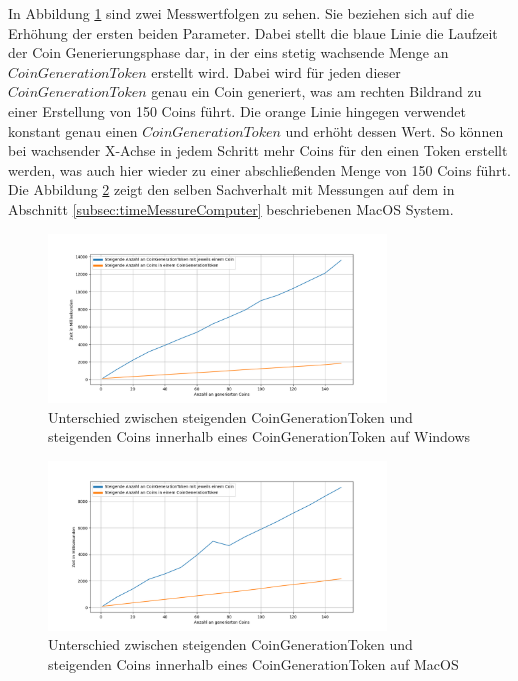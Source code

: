 \documentclass{scrreprt}
\begin{document}
In Abbildung \ref{fig:win_coins} sind zwei Messwertfolgen zu sehen. Sie beziehen sich auf die Erhöhung der ersten beiden Parameter. Dabei stellt die blaue Linie die Laufzeit der Coin Generierungsphase dar, in der eins stetig wachsende Menge an $CoinGenerationToken$ erstellt wird. Dabei wird für jeden dieser $CoinGenerationToken$ genau ein Coin generiert, was am rechten Bildrand zu einer Erstellung von 150 Coins führt. Die orange Linie hingegen verwendet konstant genau einen $CoinGenerationToken$ und erhöht dessen Wert. So können bei wachsender X-Achse in jedem Schritt mehr Coins für den einen Token erstellt werden, was auch hier wieder zu einer abschließenden Menge von 150 Coins führt. Die Abbildung \ref{fig:mac_coins} zeigt den selben Sachverhalt mit Messungen auf dem in Abschnitt \ref{subsec:timeMessureComputer} beschriebenen MacOS System.
\begin{figure}[h]
    \caption{Unterschied zwischen steigenden CoinGenerationToken und steigenden Coins innerhalb eines CoinGenerationToken auf Windows}
    \label{fig:win_coins}
    \centering
    \includegraphics[width=0.8\textwidth]{figure_win_coins.png}
\end{figure}
\begin{figure}[h]
    \caption{Unterschied zwischen steigenden CoinGenerationToken und steigenden Coins innerhalb eines CoinGenerationToken auf MacOS}
    \label{fig:mac_coins}
    \centering
    \includegraphics[width=0.8\textwidth]{figure_mac_coins.png}
\end{figure}
\end{document}
